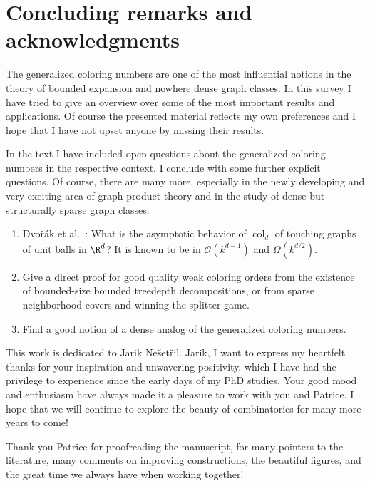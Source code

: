 \documentclass[1p,number,a4paper]{elsarticle}
\theoremstyle{remark}
\newcommand{\Oof}{\mathcal{O}}
\DeclareMathOperator{\col}{col}
\begin{document}
\section{Concluding remarks and acknowledgments}


The generalized coloring numbers are one of the most influential notions in the theory of bounded expansion and nowhere dense graph classes. 
In this survey I have tried to give an overview over some of the most important results and applications. 
Of course the presented material reflects my own preferences and I hope that I have not upset anyone by missing their results. 

In the text I have included open questions about the generalized coloring numbers in the respective context. 
I conclude with some further explicit questions. Of course, there are many more, especially in the newly developing and very exciting area of graph product theory and in the study of dense but structurally sparse graph classes. 

\begin{enumerate}
    \item Dvo\v{r}\'ak et al.~\cite{DvorakPUY22}: 
    What is the asymptotic behavior of $\col_d$ of touching graphs of unit balls in $\R^d$? It is known to be in $\Oof(k^{d-1})$ and $\Omega(k^{d/2})$. 
    \item Give a direct proof for good quality weak coloring orders from the existence of bounded-size bounded treedepth decompositions, or from sparse neighborhood covers and winning the splitter game. 
    \item Find a good notion of a dense analog of the generalized coloring numbers. 
\end{enumerate}

\bigskip

This work is dedicated to Jarik Ne\v{s}et\v{r}il. Jarik, I want to express my heartfelt thanks for your inspiration and unwavering positivity, which I have had the privilege to experience since the early days of my PhD studies.
Your good mood and enthusiasm have always made it a pleasure to work with you and Patrice.
I hope that we will continue to explore the beauty of combinatorics for many more years to come!

Thank you Patrice for proofreading the manuscript, for many pointers to the literature, many comments on improving constructions, the beautiful figures, and the great time we always have when working together!
















\end{document}
